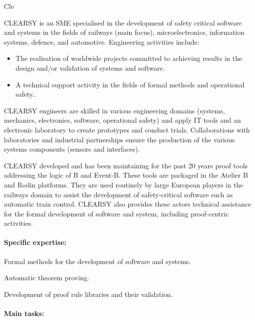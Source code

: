\begin{sitedescription}{Cle}


CLEARSY is an SME specialised in the development of safety critical software and systems in the fields
of railways (main focus), microelectronics, information systems, defence, and automotive. Engineering 
activities include:
\begin{itemize}
\item The realisation of worldwide projects committed to achieving results in the design and/or validation of systems and software.
\item A technical support activity in the fields of formal methods and operational safety..
\end{itemize}

CLEARSY engineers are skilled in various engineering domains (systems, mechanics, electronics, software,
operational safety) and apply IT tools and an electronic laboratory to create prototypes and
conduct trials. Collaborations with laboratories and industrial partnerships ensure the production of
the various systems components (sensors and interfaces).

CLEARSY developed and has been maintaining for the past 20 years proof tools addressing the logic of B and Event-B. These tools are 
packaged in the Atelier B and Rodin platforms. They are used routinely by large European players in the railways domain to assist the
development of safety-critical software such as automatic train control. CLEARSY also provides these actors technical assistance for the formal development of software and system, including proof-centric activities. 

\paragraph{Specific expertise:}

\begin{compactitem}
\item Formal methods for the development of software and systems.
\item Automatic theorem proving.
\item Development of proof rule libraries and their validation.
\end{compactitem}

\paragraph{Main tasks:}


\end{sitedescription}
